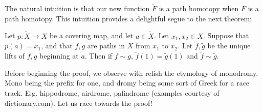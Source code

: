 The natural intuition is that our new function $\widetilde{F}$ is a path homotopy when $F$ is a path homotopy. This intuition provides a delightful segue to the next theorem: 
\begin{theorem}
	 Let $p: \widetilde{X}\to X$ be a covering map, and let $a\in \widetilde{X}$. Let $x_1,x_2\in X$. Suppose that $p(a)=x_1$, and that $f,g$ are paths in $X$ from $x_1$ to $x_2$. Let $\widetilde{f}, \widetilde{g}$ be the unique lifts of $f,g$ beginning at $a$. Then if $f\sim g$, $\widetilde{f}(1)=\widetilde{g}(1)$ and $\widetilde{f}\sim \widetilde{g}$. 
\end{theorem}
Before beginning the proof, we observe with relish the etymology of monodromy. Mono being the prefix for one, and dromy being some sort of Greek for a race track. E.g. hippodrome, airdrome, palindrome (examples courtesy of dictionary.com). Let us race towards the proof! 
